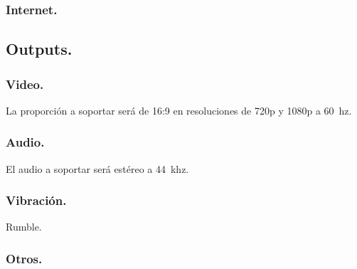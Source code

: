 \subsubsection{Internet.}

\subsection{Outputs.}

\subsubsection{Video.}
La proporción a soportar será de 16:9 en resoluciones de 720p y 1080p a 60~hz.

\subsubsection{Audio.}
El audio a soportar será estéreo a 44~khz.

\subsubsection{Vibración.}
Rumble.

\subsubsection{Otros.}